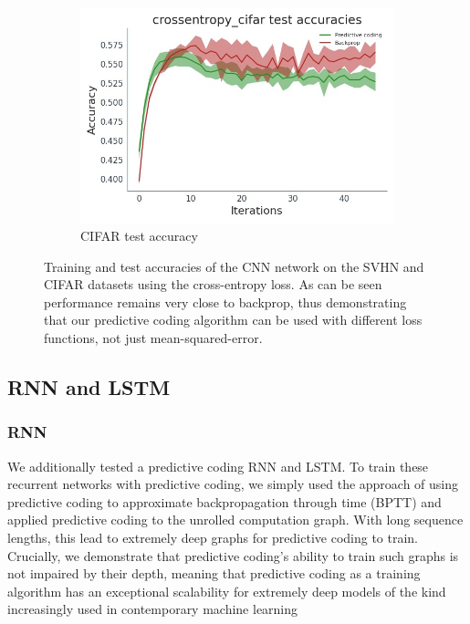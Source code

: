 \begin{figure}
        \begin{subfigure}[b]{0.475\textwidth}   
            \centering 
            \includegraphics[width=\textwidth]{chapter_6_figures/crossentropy_cifar_test accuracies_prelim_2.jpg}
            \caption[]
            {{\small CIFAR test accuracy}}    
        \end{subfigure}
        \caption{\small Training and test accuracies of the CNN network on the SVHN and CIFAR datasets using the cross-entropy loss. As can be seen performance remains very close to backprop, thus demonstrating that our predictive coding algorithm can be used with different loss functions, not just mean-squared-error.} 
        \label{fig:mean and std of nets}
    \end{figure}

\subsection{RNN and LSTM}
\subsubsection{RNN}
We additionally tested a predictive coding RNN and LSTM. To train these recurrent networks with predictive coding, we simply used the approach of using predictive coding to approximate backpropagation through time (BPTT) and applied predictive coding to the unrolled computation graph. With long sequence lengths, this lead to extremely deep graphs for predictive coding to train. Crucially, we demonstrate that predictive coding's ability to train such graphs is not impaired by their depth, meaning that predictive coding as a training algorithm has an exceptional scalability for extremely deep models of the kind increasingly used in contemporary machine learning \citep{radford2019language,he2016deep}


